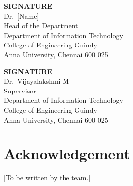 \documentclass[12pt,a4paper,oneside]{report}
\begin{document}
\vspace{3cm}
\noindent
\begin{minipage}[t]{0.48\textwidth}
\textbf{SIGNATURE}\\[4pt]
Dr.\ [Name]\\
Head of the Department\\
Department of Information Technology\\
College of Engineering Guindy\\
Anna University, Chennai 600 025
\end{minipage}\hfill
\begin{minipage}[t]{0.48\textwidth}
\textbf{SIGNATURE}\\[4pt]
Dr.\ Vijayalakshmi M\\
Supervisor\\
Department of Information Technology\\
College of Engineering Guindy\\
Anna University, Chennai 600 025
\end{minipage}

\chapter*{Acknowledgement}
[To be written by the team.]



\tableofcontents
\listoffigures
\listoftables


\clearpage
{}











\appendix

\end{document}
